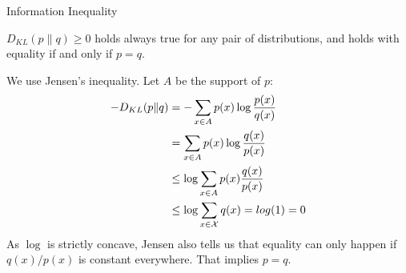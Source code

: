 \documentclass[11pt,compress,t,notes=noshow, xcolor=table]{beamer}
\begin{document}
\begin{vbframe} {Information Inequality}

$ D_{KL}(p \| q) \geq 0$ holds always true for any pair of distributions, and holds with equality if and only if $p=q$. 

\lz  

We use Jensen's inequality. Let $A$ be the support of $p$:
\begin{equation*}
    \begin{aligned} 
-D_{KL}(p \| q) &= -\sum_{x \in A} p(x) \log \frac{p(x)}{q(x)} \\
                &=  \sum_{x \in A} p(x) \log \frac{q(x)}{p(x)} \\
                &\leq \log \sum_{x \in A} p(x) \frac{q(x)}{p(x)} \\
                &\leq \log \sum_{x \in \mathcal{X}} q(x) = log(1) = 0 
    \end{aligned} 
  \end{equation*}
As $\log$ is strictly concave, Jensen also tells us that equality can only happen if $q(x)/p(x)$ is constant everywhere. That implies $p=q$.
\end{vbframe}
\end{document}
